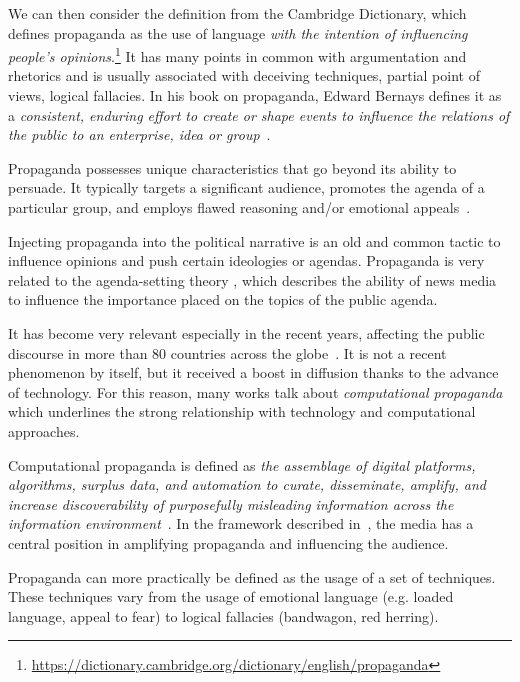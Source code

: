 
We can then consider the definition from the Cambridge Dictionary, which defines propaganda as the use of language \emph{with the intention of influencing people's opinions}.\footnote{\url{https://dictionary.cambridge.org/dictionary/english/propaganda}}
It has many points in common with argumentation and rhetorics and is usually associated with deceiving techniques, partial point of views, logical fallacies.
In his book on propaganda, Edward Bernays defines it as a \emph{consistent, enduring effort to create or shape events to influence the relations of the public to an enterprise, idea or group}~\cite{bernays}.

Propaganda possesses unique characteristics that go beyond its ability to persuade. It typically targets a significant audience, promotes the agenda of a particular group, and employs flawed reasoning and/or emotional appeals~\cite{miller1939techniques}.

Injecting propaganda into the political narrative is an old and common tactic to influence opinions and push certain ideologies or agendas.
Propaganda is very related to the agenda-setting theory \citep{Cohen_1964,mccombs1972agenda}, which describes the ability of news media to influence the importance placed on the topics of the public agenda.

It has become very relevant especially in the recent years, affecting the public discourse in more than 80 countries across the globe~\citep{bradshaw2021industrialized}.
It is not a recent phenomenon by itself, but it received a boost in diffusion thanks to the advance of technology.
For this reason, many works talk about \emph{computational propaganda} which underlines the strong relationship with technology and computational approaches.

Computational propaganda is defined as \emph{the assemblage of digital platforms, algorithms, surplus data, and automation to curate, disseminate, amplify,
and increase discoverability of purposefully misleading information across the information
environment}~\citep{hassan2023}.
In the framework described in~\citet{hassan2023}, the media has a central position in amplifying propaganda and influencing the audience.

Propaganda can more practically be defined as the usage of a set of techniques. These techniques vary from the usage of emotional language (e.g. loaded language, appeal to fear) to logical fallacies (bandwagon, red herring).


